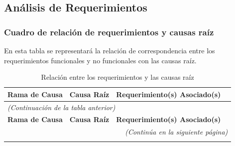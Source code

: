 \subsection{Análisis de Requerimientos}

\subsubsection{Cuadro de relación de requerimientos y causas raíz}
En esta tabla se representará la relación de correspondencia entre los requerimientos funcionales y no funcionales con las causas raíz.

\begin{longtable}{p{3.5cm} p{4.5cm} p{4cm} p{2cm}}
    \caption{Relación entre los requerimientos y las causas raíz}
    \label{tab:trazabilidad_requerimientos} \\
    
    \toprule
    \textbf{Rama de Causa} &
     \textbf{Causa Raíz} &
      \textbf{Requerimiento(s) Asociado(s)} &
    \\ 
    \midrule
    \endfirsthead
    
    \multicolumn{4}{l}{\textit{(Continuación de la tabla anterior)}} \\
    \toprule
    \textbf{Rama de Causa} &
     \textbf{Causa Raíz} &
      \textbf{Requerimiento(s) Asociado(s)}\\ 
    \midrule
    \endhead
    
    \midrule
    \multicolumn{4}{r}{\textit{(Continúa en la siguiente página)}} \\
    \endfoot
    
    \bottomrule
    \endlastfoot


\end{longtable}

